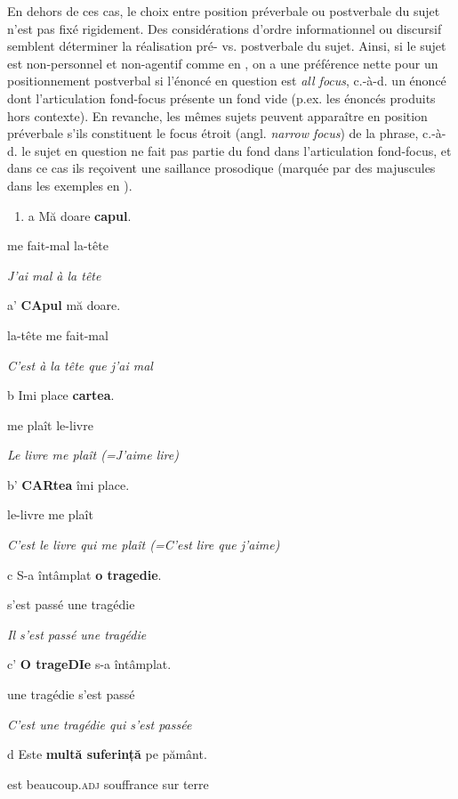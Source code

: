 En dehors de ces cas, le choix entre position préverbale ou postverbale du sujet n'est pas fixé rigidement. Des considérations d'ordre informationnel ou discursif semblent déterminer la réalisation pré- vs. postverbale du sujet. Ainsi, si le sujet est non-personnel et non-agentif comme en , on a une préférence nette pour un positionnement postverbal si l'énoncé en question est \textit{all focus}, c.-à-d. un énoncé dont l'articulation fond-focus présente un fond vide (p.ex. les énoncés produits hors contexte). En revanche, les mêmes sujets peuvent apparaître en position préverbale s'ils constituent le focus étroit (angl. \textit{narrow focus}) de la phrase, c.-à-d. le sujet en question ne fait pas partie du fond dans l'articulation fond-focus, et dans ce cas ils reçoivent une saillance prosodique (marquée par des majuscules dans les exemples en ).  


\begin{enumerate}
\item \label{bkm:Ref283930992}a  Mă  doare  \textbf{capul}.


\end{enumerate}
me  fait-mal\textsc{ } la-tête

{\itshape
J'ai mal à la tête}

a'  \textbf{CApul } mă  doare.

la-tête\textsc{ } me  fait-mal\textsc{} 

  \textit{C'est à la tête que j'ai mal}

b  Imi  place  \textbf{cartea}.

me  plaît\textsc{ } le-livre

  \textit{Le livre me plaît (=J'aime lire)}

b'  \textbf{CARtea } îmi  place.

le-livre  me  plaît

{\itshape
C'est le livre qui me plaît (=C'est lire que j'aime)}

  c  S-a  întâmplat  \textbf{o  tragedie}.

s'est  passé  une  tragédie

{\itshape
Il s'est passé une tragédie}

  c'  \textbf{O  trageDIe } s-a  întâmplat.

une  tragédie  s'est  passé 

{\itshape
C'est une tragédie qui s'est passée}

d  Este  \textbf{multă  suferință}  pe  pământ.

  est  beaucoup.\textsc{adj}  souffrance  sur  terre

